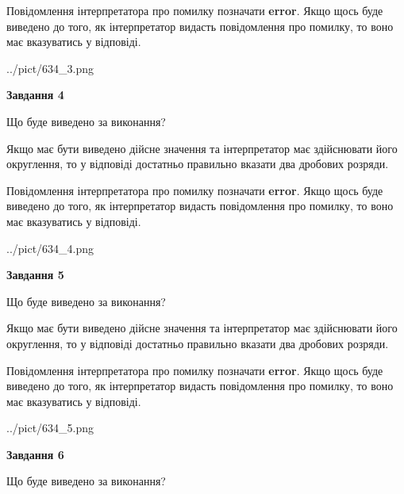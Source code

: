 \documentclass[12pt, ukrainian]{article}
\begin{document}
{\begin {Large}
Повідомлення інтерпретатора про помилку позначати \textbf{error}.
Якщо щось буде виведено до того, як інтерпретатор видасть повідомлення про помилку, 
то воно має вказуватись у відповіді. \par

\begin{center}
	{../pict/634_3.png}
\end{center}
\newpage

{\begin {center}\textbf{Завдання 4}\end {center}}\par
Що буде виведено за виконання? \par

Якщо має бути виведено дійсне значення та інтерпретатор має здійснювати його округлення, 
то у відповіді достатньо правильно вказати два дробових розряди.

Повідомлення інтерпретатора про помилку позначати \textbf{error}.
Якщо щось буде виведено до того, як інтерпретатор видасть повідомлення про помилку, 
то воно має вказуватись у відповіді. \par

\begin{center}
	{../pict/634_4.png}
\end{center}
\newpage

{\begin {center}\textbf{Завдання 5}\end {center}}\par
Що буде виведено за виконання? \par

Якщо має бути виведено дійсне значення та інтерпретатор має здійснювати його округлення, 
то у відповіді достатньо правильно вказати два дробових розряди.

Повідомлення інтерпретатора про помилку позначати \textbf{error}.
Якщо щось буде виведено до того, як інтерпретатор видасть повідомлення про помилку, 
то воно має вказуватись у відповіді. \par

\begin{center}
	{../pict/634_5.png}
\end{center}
\newpage

{\begin {center}\textbf{Завдання 6}\end {center}}\par
Що буде виведено за виконання? \par


\end{Large}}
\end{document}
